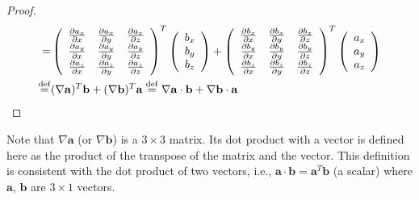 \documentclass[11pt]{article}              %
\begin{document}
\begin{proof}
\begin{align}
	=&\left(\begin{array}{ccc}\frac{\partial a_x}{\partial x}&\frac{\partial a_x}{\partial y}&\frac{\partial a_x}{\partial z}\\\frac{\partial a_y}{\partial x}&\frac{\partial a_y}{\partial y}&\frac{\partial a_y}{\partial z}\\\frac{\partial a_z}{\partial x}&\frac{\partial a_z}{\partial y}&\frac{\partial a_z}{\partial z}\end{array}\right)^T\left(\begin{array}{c}b_x\\b_y\\b_z\end{array}\right)+\left(\begin{array}{ccc}\frac{\partial b_x}{\partial x}&\frac{\partial b_x}{\partial y}&\frac{\partial b_x}{\partial z}\\\frac{\partial b_y}{\partial x}&\frac{\partial b_y}{\partial y}&\frac{\partial b_y}{\partial z}\\\frac{\partial b_z}{\partial x}&\frac{\partial b_z}{\partial y}&\frac{\partial b_z}{\partial z}\end{array}\right)^T\left(\begin{array}{c}a_x\\a_y\\a_z\end{array}\right)\notag\\
	\stackrel{\operatorname{def}}{=}&(\nabla{\mathbf a})^T{\mathbf b}+(\nabla{\mathbf b})^T{\mathbf a}\stackrel{\operatorname{def}}{=}\nabla{\mathbf a}\cdot{\mathbf b}+\nabla{\mathbf b}\cdot{\mathbf a}\notag
\end{align}
\end{proof}
Note that $\nabla {\mathbf a}$ (or $\nabla {\mathbf b}$) is a $3\times 3$ matrix. Its dot product with a vector is defined here as the product of the transpose of the matrix and the vector. This definition is consistent with the dot product of two vectors, i.e., ${\mathbf a}\cdot{\mathbf b}={\mathbf a}^T{\mathbf b}$ (a scalar) where ${\mathbf a}$, ${\mathbf b}$ are $3\times 1$ vectors.
\end{document}
